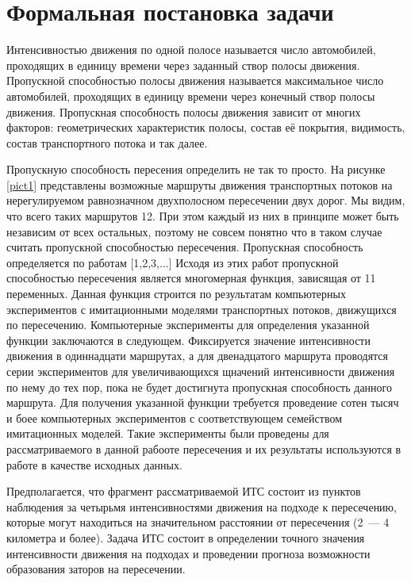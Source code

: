 \documentclass[a4paper,14pt]{article}
\begin{document}
\section{Формальная постановка задачи}

Интенсивностью движения по одной полосе называется число автомобилей, проходящих в единицу времени через заданный створ полосы движения. Пропускной способностью полосы движения называется максимальное число автомобилей, проходящих в единицу времени через конечный створ полосы движения. Пропускная способность полосы движения зависит от многих факторов: геометрических характеристик полосы, состав её покрытия, видимость, состав транспортного потока и так далее.

Пропускную способность пересения определить не так то просто. 
На рисунке \ref{pict1} представлены возможные маршруты движения транспортных потоков на нерегулируемом равнозначном двухполосном пересечении двух дорог. Мы видим, что всего таких маршрутов 12. При этом каждый из них в принципе может быть независим от всех остальных, поэтому не совсем понятно что в таком случае считать пропускной способностью пересечения. Пропускная способность определяется по работам [1,2,3,...]
Исходя из этих работ пропускной способностью пересечения является многомерная функция, зависящая от 11 переменных. Данная функция строится по результатам компьютерных экспериментов с имитационными моделями транспортных потоков, движущихся по пересечению. Компьютерные эксперименты для определения указанной функции заключаются в следующем. Фиксируется значение интенсивности движения в одиннадцати маршрутах, а для двенадцатого маршрута проводятся серии экспериментов для увеличивающихся щначений интенсивности движения по нему до тех пор, пока не будет достигнута пропускная способность данного маршрута. Для получения указанной функции требуется проведение сотен тысяч и боее компьютерных экспериментов с соответствующем семейством имитационных моделей. Такие эксперименты были проведены для рассматриваемого в данной рабооте пересечения и их результаты используются в работе в качестве исходных данных. 

Предполагается, что фрагмент рассматриваемой ИТС состоит из пунктов наблюдения за четырьмя интенсивностями движения на подходе к пересечению, которые могут находиться на значительном расстоянии от пересечения (2~--- 4 километра и более). Задача ИТС состоит в определении точного значения интенсивности движения на подходах и проведении прогноза возможности образования заторов на пересечении. 
\end{document}
